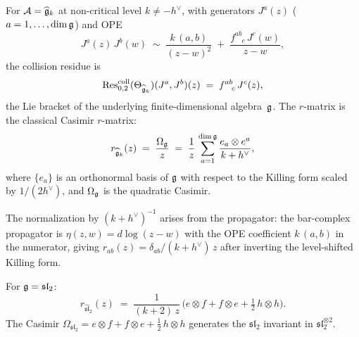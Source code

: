 \begin{computation}
\label{comp:thqg-V-affine-r}
For $\mathcal{A} = \widehat{\mathfrak{g}}_k$ at non-critical level
$k \neq -h^\vee$, with generators $J^a(z)$ ($a = 1,\dotsc,
\dim\mathfrak{g}$) and OPE
\[
J^a(z)\,J^b(w)
\;\sim\;
\frac{k\,(a,b)}{(z-w)^2}
\;+\;
\frac{f^{ab}_{\phantom{ab}c}\,J^c(w)}{z-w},
\]
the collision residue is
\begin{equation}\label{eq:thqg-V-affine-collision}
\operatorname{Res}^{\mathrm{coll}}_{0,2}(\Theta_{\widehat{\mathfrak{g}}_k})
 (J^a, J^b)(z)
\;=\;
f^{ab}_{\phantom{ab}c}\,J^c(z),
\end{equation}
the Lie bracket of the underlying finite-dimensional algebra~$\mathfrak{g}$.
The $r$-matrix is the classical Casimir $r$-matrix:
\begin{equation}\label{eq:thqg-V-affine-r}
r_{\widehat{\mathfrak{g}}_k}(z)
\;=\;
\frac{\Omega_{\mathfrak{g}}}{z}
\;=\;
\frac{1}{z}\,
\sum_{a=1}^{\dim\mathfrak{g}}
\frac{e_a \otimes e^a}{k + h^\vee},
\end{equation}
where $\{e_a\}$ is an orthonormal basis of $\mathfrak{g}$ with respect to the
Killing form scaled by $1/(2h^\vee)$, and $\Omega_{\mathfrak{g}}$ is the
quadratic Casimir.

The normalization by $(k + h^\vee)^{-1}$ arises from the propagator:
the bar-complex propagator is $\eta(z,w) = d\log(z - w)$ with the
OPE coefficient $k\,(a,b)$ in the numerator, giving
$r_{ab}(z) = \delta_{ab}/(k + h^\vee)\,z$ after inverting the
level-shifted Killing form.

For $\mathfrak{g} = \mathfrak{sl}_2$:
\begin{equation}\label{eq:thqg-V-sl2-r}
r_{\widehat{\mathfrak{sl}}_2}(z)
\;=\;
\frac{1}{(k+2)\,z}\,
\bigl(e \otimes f + f \otimes e + \tfrac{1}{2}\,h \otimes h\bigr).
\end{equation}
The Casimir $\Omega_{\mathfrak{sl}_2} =
e \otimes f + f \otimes e + \frac{1}{2}\,h \otimes h$
generates the $\mathfrak{sl}_2$ invariant in
$\mathfrak{sl}_2^{\otimes 2}$.
\end{computation}

